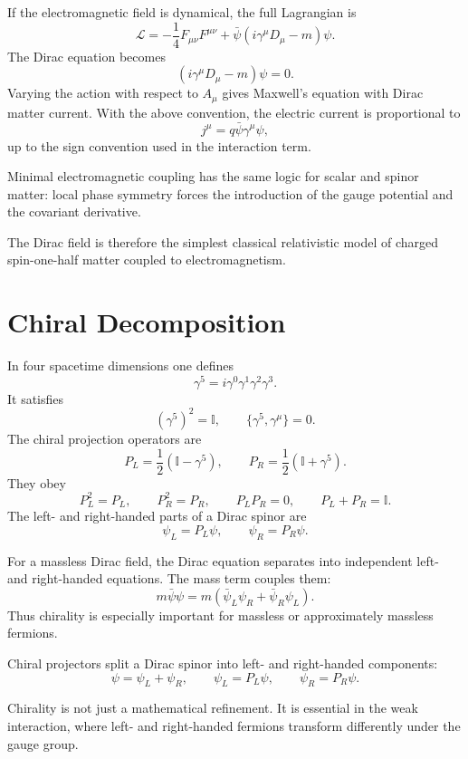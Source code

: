 If the electromagnetic field is dynamical, the full Lagrangian is
\[
    \mathcal{L}
    =-\frac{1}{4}F_{\mu\nu}F^{\mu\nu}
     +\bar\psi(i\gamma^\mu D_\mu-m)\psi.
\]
The Dirac equation becomes
\[
    (i\gamma^\mu D_\mu-m)\psi=0.
\]
Varying the action with respect to \(A_\mu\) gives Maxwell's equation with Dirac
matter current. With the above convention, the electric current is proportional
to
\[
    j^\mu=q\bar\psi\gamma^\mu\psi,
\]
up to the sign convention used in the interaction term.

\begin{remarkbox}
Minimal electromagnetic coupling has the same logic for scalar and spinor
matter: local phase symmetry forces the introduction of the gauge potential and
the covariant derivative.
\end{remarkbox}

The Dirac field is therefore the simplest classical relativistic model of
charged spin-one-half matter coupled to electromagnetism.

\section{Chiral Decomposition}

In four spacetime dimensions one defines
\[
    \gamma^5=i\gamma^0\gamma^1\gamma^2\gamma^3.
\]
It satisfies
\[
    (\gamma^5)^2=\mathbb{I},
    \qquad
    \{\gamma^5,\gamma^\mu\}=0.
\]
The chiral projection operators are
\[
    P_L=\frac{1}{2}(\mathbb{I}-\gamma^5),
    \qquad
    P_R=\frac{1}{2}(\mathbb{I}+\gamma^5).
\]
They obey
\[
    P_L^2=P_L,
    \qquad
    P_R^2=P_R,
    \qquad
    P_LP_R=0,
    \qquad
    P_L+P_R=\mathbb{I}.
\]
The left- and right-handed parts of a Dirac spinor are
\[
    \psi_L=P_L\psi,
    \qquad
    \psi_R=P_R\psi.
\]

For a massless Dirac field, the Dirac equation separates into independent left-
and right-handed equations. The mass term couples them:
\[
    m\bar\psi\psi=m(\bar\psi_L\psi_R+\bar\psi_R\psi_L).
\]
Thus chirality is especially important for massless or approximately massless
fermions.

\begin{definitionbox}
Chiral projectors split a Dirac spinor into left- and right-handed components:
\[
    \psi=\psi_L+\psi_R,
    \qquad
    \psi_L=P_L\psi,
    \qquad
    \psi_R=P_R\psi.
\]
\end{definitionbox}

Chirality is not just a mathematical refinement. It is essential in the weak
interaction, where left- and right-handed fermions transform differently under
the gauge group.

